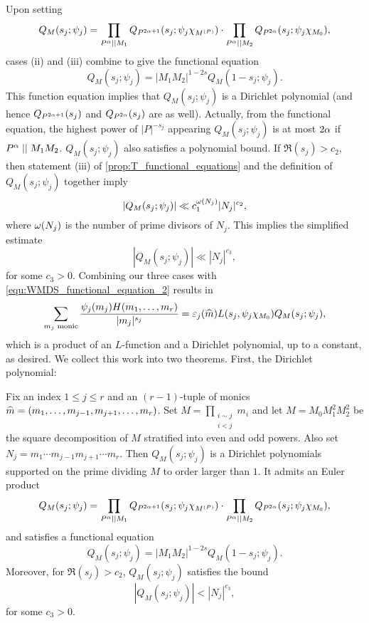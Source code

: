\documentclass[12pt,reqno,oneside]{amsart}
\begin{document}
    Upon setting
    \[
        Q_{M}(s_{j};\psi_{j}) = \prod_{P^{\alpha} \mid\mid M_{1}}Q_{P^{2\alpha+1}}(s_{j};\psi_{j}\chi_{M^{(P)}}) \cdot \prod_{P^{\alpha} \mid\mid M_{2}}Q_{P^{2\alpha}}(s_{j};\psi_{j}\chi_{M_{0}}),
    \]
    cases (ii) and (iii) combine to give the functional equation
    \[
        Q_{M}(s_{j};\psi_{j}) = |M_{1}M_{2}|^{1-2s}Q_{M}(1-s_{j};\psi_{j}).
    \]
    This function equation implies that $Q_{M}(s_{j};\psi_{j})$ is a Dirichlet polynomial (and hence $Q_{P^{2\alpha+1}}(s_{j})$ and $Q_{P^{2\alpha}}(s_{j})$ are as well). Actually, from the functional equation, the highest power of $|P|^{-s_{j}}$ appearing $Q_{M}(s_{j};\psi_{j})$ is at most $2\alpha$ if $P^{\alpha} \mid\mid M_{1}M_{2}$. $Q_{M}(s_{j};\psi_{j})$ also satisfies a polynomial bound. If $\Re(s_{j}) > c_{2}$, then statement (iii) of \cref{prop:T_functional_equations} and the definition of $Q_{M}(s_{j};\psi_{j})$ together imply
    \[
        |Q_{M}(s_{j};\psi_{j})| \ll c_{1}^{\omega(N_{j})}|N_{j}|^{c_{2}},
    \]
    where $\omega(N_{j})$ is the number of prime divisors of $N_{j}$. This implies the simplified estimate
    \[
        |Q_{M}(s_{j};\psi_{j})| \ll |N_{j}|^{c_{3}},
    \]
    for some $c_{3} > 0$. Combining our three cases with \cref{equ:WMDS_functional_equation_2} results in
    \begin{equation}\label{equ:WMDS_functional_equation_3}
        \sum_{\text{$m_{j}$ monic}}\frac{\psi_{j}(m_{j})H(m_{1},\ldots,m_{r})}{|m_{j}|^{s_{j}}} = \varepsilon_{j}(\widehat{m})L(s_{j},\psi_{j}\chi_{M_{0}})Q_{M}(s_{j};\psi_{j}),
    \end{equation}
    which is a product of an $L$-function and a Dirichlet polynomial, up to a constant, as desired. We collect this work into two theorems. First, the Dirichlet polynomial:

    \begin{theorem}\label{thm:correction_polynomial}
        Fix an index $1 \le j \le r$ and an $(r-1)$-tuple of monics $\widehat{m} = (m_{1},\ldots,m_{j-1},m_{j+1},\ldots,m_{r})$. Set $M = \prod_{\substack{i \sim j \\ i < j}}m_{i}$ and let $M = M_{0}M_{1}^{2}M_{2}^{2}$ be the square decomposition of $M$ stratified into even and odd powers. Also set $N_{j} = m_{1} \cdots m_{j-1}m_{j+1} \cdots m_{r}$. Then $Q_{M}(s_{j};\psi_{j})$ is a Dirichlet polynomials supported on the prime dividing $M$ to order larger than $1$. It admits an Euler product
        \[
            Q_{M}(s_{j};\psi_{j}) = \prod_{P^{\alpha} \mid\mid M_{1}}Q_{P^{2\alpha+1}}(s_{j};\psi_{j}\chi_{M^{(P)}}) \cdot \prod_{P^{\alpha} \mid\mid M_{2}}Q_{P^{2\alpha}}(s_{j};\psi_{j}\chi_{M_{0}}),
        \]
        and satisfies a functional equation
        \[
            Q_{M}(s_{j};\psi_{j}) = |M_{1}M_{2}|^{1-2s}Q_{M}(1-s_{j};\psi_{j}).
        \]
        Moreover, for $\Re(s_{j}) > c_{2}$, $Q_{M}(s_{j};\psi_{j})$ satisfies the bound
        \[
            |Q_{M}(s_{j};\psi_{j})| < |N_{j}|^{c_{3}},
        \]
        for some $c_{3} > 0$.
    \end{theorem}
\end{document}
